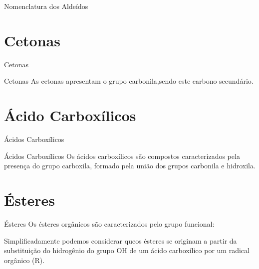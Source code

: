 \documentclass[presentation,professionalfonts,aspectratio=169]{beamer}
\begin{document}
\begin{frame}[label={sec:org00c44b7}]{Nomenclatura dos Aldeídos}

\end{frame}

\section{Cetonas}
\label{sec:orge0e976a}

\begin{frame}[label={sec:org6276cfd}]{Cetonas}
\begin{mybox}{Cetonas}
As cetonas apresentam o grupo carbonila,sendo este carbono secundário.
\begin{center}
\end{center}
\end{mybox}
\end{frame}


\section{Ácido Carboxílicos}
\label{sec:org3d117e7}
\begin{frame}[label={sec:orgd2e1dbe}]{Ácidos Carboxílicos}
\begin{mybox}{Ácidos Carboxílicos}
Os ácidos carboxílicos são compostos caracterizados pela  presença do grupo \alert{carboxila}, formado pela união dos grupos carbonila e hidroxila.


\begin{center}
\end{center}
\end{mybox}
\end{frame}


\section{Ésteres}
\label{sec:org6fbb3a5}
\begin{mybox}{Ésteres}
Os ésteres orgânicos são caracterizados pelo grupo funcional:
\begin{center}
\end{center}
Simplificadamente podemos considerar queos ésteres
se originam a partir da substituição do hidrogênio do grupo OH de um
ácido carboxílico por um radical orgânico (R).
\end{mybox}
\end{document}
